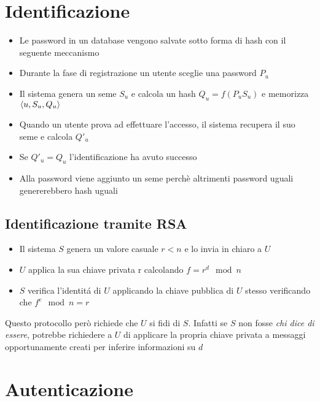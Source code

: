 \section{Identificazione}

\begin{itemize}
    \item Le password in un database vengono salvate sotto forma di hash con il seguente meccanismo
    \item Durante la fase di registrazione un utente sceglie una password $P_u$
    \item Il sistema genera un seme $S_u$ e calcola un hash $Q_u = f(P_uS_u)$ e memorizza $\langle u, S_u, Q_u\rangle$
    \item Quando un utente prova ad effettuare l'accesso, il sistema recupera il suo seme e calcola $Q'_u$
    \item Se $Q'_u = Q_u$ l'identificazione ha avuto successo
    \item Alla password viene aggiunto un seme perch\`e altrimenti password uguali genererebbero hash uguali
\end{itemize}

\subsection{Identificazione tramite RSA}

\begin{itemize}
    \item Il sistema $S$ genera un valore casuale $r < n$ e lo invia in chiaro a $U$
    \item $U$ applica la sua chiave privata r calcolando $f = r^d \mod{n}$
    \item $S$ verifica l'identit\'a di $U$ applicando la chiave pubblica di $U$ stesso verificando che $f^e \mod{n} = r$
\end{itemize}

Questo protocollo per\`o richiede che $U$ si fidi di $S$. Infatti se $S$ non fosse \textit{chi dice di essere}, potrebbe richiedere a $U$ di applicare la propria chiave privata a messaggi opportunamente creati per inferire informazioni su $d$

\section{Autenticazione}

